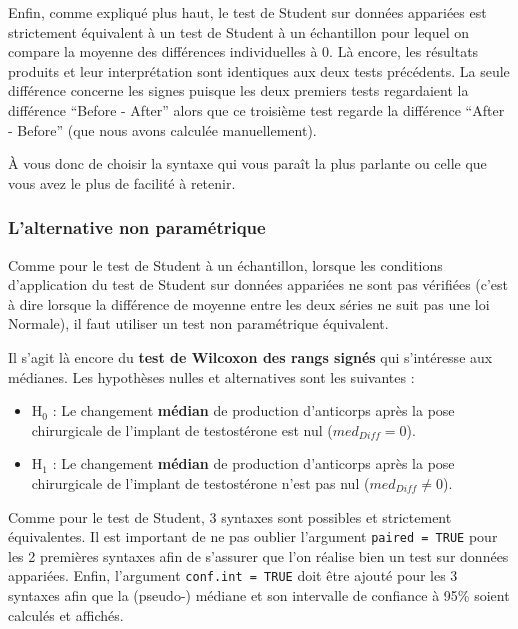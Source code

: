 \documentclass[a4paperpaper,]{article}
\providecommand{\tightlist}{%
  \setlength{\itemsep}{0pt}\setlength{\parskip}{0pt}}
\begin{document}
Enfin, comme expliqué plus haut, le test de Student sur données appariées est strictement équivalent à un test de Student à un échantillon pour lequel on compare la moyenne des différences individuelles à 0. Là encore, les résultats produits et leur interprétation sont identiques aux deux tests précédents. La seule différence concerne les signes puisque les deux premiers tests regardaient la différence ``Before - After'' alors que ce troisième test regarde la différence ``After - Before'' (que nous avons calculée manuellement).

À vous donc de choisir la syntaxe qui vous paraît la plus parlante ou celle que vous avez le plus de facilité à retenir.

\hypertarget{lalternative-non-parametrique-1}{%
\subsubsection{L'alternative non paramétrique}\label{lalternative-non-parametrique-1}}

Comme pour le test de Student à un échantillon, lorsque les conditions d'application du test de Student sur données appariées ne sont pas vérifiées (c'est à dire lorsque la différence de moyenne entre les deux séries ne suit pas une loi Normale), il faut utiliser un test non paramétrique équivalent.

Il s'agit là encore du \textbf{test de Wilcoxon des rangs signés} qui s'intéresse aux médianes. Les hypothèses nulles et alternatives sont les suivantes :

\begin{itemize}
\tightlist
\item
  H\(_0\) : Le changement \textbf{médian} de production d'anticorps après la pose chirurgicale de l'implant de testostérone est nul (\(med_{Diff} = 0\)).
\item
  H\(_1\) : Le changement \textbf{médian} de production d'anticorps après la pose chirurgicale de l'implant de testostérone n'est pas nul (\(med_{Diff} \neq 0\)).
\end{itemize}

Comme pour le test de Student, 3 syntaxes sont possibles et strictement équivalentes. Il est important de ne pas oublier l'argument \texttt{paired\ =\ TRUE} pour les 2 premières syntaxes afin de s'assurer que l'on réalise bien un test sur données appariées. Enfin, l'argument \texttt{conf.int\ =\ TRUE} doit être ajouté pour les 3 syntaxes afin que la (pseudo-) médiane et son intervalle de confiance à 95\% soient calculés et affichés.
\end{document}
